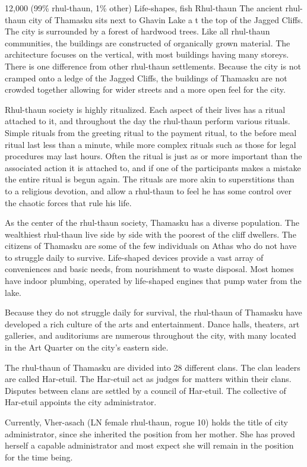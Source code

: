 {12,000 (99\% rhul-thaun, 1\% other)}
{Life-shapes, fish}
{Rhul-thaun}
{
	The ancient rhul-thaun city of Thamasku sits next to Ghavin Lake a t the top of the Jagged Cliffs. The city is surrounded by a forest of hardwood trees. Like all rhul-thaun communities, the buildings are constructed of organically grown material. The architecture focuses on the vertical, with most buildings having many storeys. There is one difference from other rhul-thaun settlements. Because the city is not cramped onto a ledge of the Jagged Cliffs, the buildings of Thamasku are not crowded together allowing for wider streets and a more open feel for the city.
}
{
Rhul-thaun society is highly ritualized. Each aspect of their lives has a ritual attached to it, and throughout the day the rhul-thaun perform various rituals. Simple rituals from the greeting ritual to the payment ritual, to the before meal ritual last less than a minute, while more complex rituals such as those for legal procedures may last hours. Often the ritual is just as or more important than the associated action it is attached to, and if one of the participants makes a mistake the entire ritual is begun again. The rituals are more akin to superstitions than to a religious devotion, and allow a rhul-thaun to feel he has some control over the chaotic forces that rule his life.

As the center of the rhul-thaun society, Thamasku has a diverse population. The wealthiest rhul-thaun live side by side with the poorest of the cliff dwellers. The citizens of Thamasku are some of the few individuals on Athas who do not have to struggle daily to survive. Life-shaped devices provide a vast array of conveniences and basic needs, from nourishment to waste disposal. Most homes have indoor plumbing, operated by life-shaped engines that pump water from the lake.

Because they do not struggle daily for survival, the rhul-thaun of Thamasku have developed a rich culture of the arts and entertainment. Dance halls, theaters, art galleries, and auditoriums are numerous throughout the city, with many located in the Art Quarter on the city's eastern side.
}
{
	The rhul-thaun of Thamasku are divided into 28 different clans. The clan leaders are called Har-etuil. The Har-etuil act as judges for matters within their clans. Disputes between clans are settled by a council of Har-etuil. The collective of Har-etuil appoints the city administrator.

	Currently, Vher-asach (LN female rhul-thaun, rogue 10) holds the title of city administrator, since she inherited the position from her mother. She has proved herself a capable administrator and most expect she will remain in the position for the time being.
}
